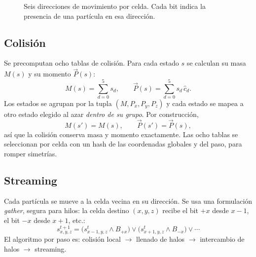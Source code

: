 \documentclass[11pt,a4paper]{article}
\begin{document}
\begin{figure}[H]
\centering
{}
\caption{Seis direcciones de movimiento por celda. Cada bit indica la
presencia de una partícula en esa dirección.}
\label{fig:dirs}
\end{figure}

\subsection{Colisión}

Se precomputan ocho tablas de colisión. Para cada estado $s$ se calculan su
masa $M(s)$ y su momento $\vec{P}(s)$:
\begin{equation}
  M(s)=\sum_{d=0}^{5} s_d,\qquad
  \vec{P}(s)=\sum_{d=0}^{5} s_d\,\hat{c}_d .
\end{equation}
Los estados se agrupan por la tupla $(M,P_x,P_y,P_z)$ y cada estado se mapea a
otro estado elegido al azar \emph{dentro de su grupo}. Por construcción,
\begin{equation}
  M(s')=M(s),\qquad \vec{P}(s')=\vec{P}(s),
\end{equation}
así que la colisión conserva masa y momento exactamente. Las ocho tablas se
seleccionan por celda con un hash de las coordenadas globales y del paso, para
romper simetrías.

\subsection{Streaming}

Cada partícula se mueve a la celda vecina en su dirección. Se usa una
formulación \emph{gather}, segura para hilos: la celda destino $(x,y,z)$
recibe el bit $+x$ desde $x-1$, el bit $-x$ desde $x+1$, etc.:
\begin{equation}
  s^{t+1}_{x,y,z} = \bigl(s^t_{x-1,y,z}\wedge B_{+x}\bigr)
  \vee \bigl(s^t_{x+1,y,z}\wedge B_{-x}\bigr) \vee \cdots
\end{equation}
El algoritmo por paso es: colisión local $\to$ llenado de halos $\to$
intercambio de halos $\to$ streaming.
\end{document}
